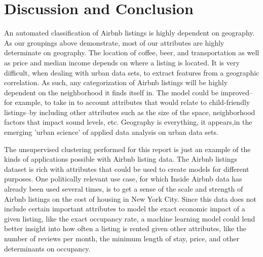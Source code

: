 \documentclass[conference]{IEEEtran}
\begin{document}
\section{Discussion and Conclusion}
An automated classification of Airbnb listings is highly dependent on geography. As our groupings above demonstrate, most of our
attributes are highly determinate on geography. The location of coffee, beer, and transportation as well as price and median income
depends on where a listing is located. It is very difficult, when dealing with urban data sets, to extract features from a geographic
correlation. As such, any categorization of Airbnb listings will be highly dependent on the neighborhood it finds itself in. The 
model could be improved–for example, to take in to account attributes that would relate to child-friendly listings–by including
other attributes such as the size of the space, neighborhood factors that impact sound levels, etc. Geography is everything, it 
appears,in the emerging 'urban science' of applied data analysis on urban data sets.

The unsupervised clustering performed for this report is just an example of the kinds of applications possible with Airbnb listing
data. The Airbnb listings dataset is rich with attributes that could be used to create models for different purposes. One 
politically relevant use case, for which Inside Airbnb data has already been used several times, is to get a sense of the scale 
and strength of Airbnb listings on the cost of housing in New York City. Since this data does not include certain important attributes
to model the exact economic impact of a given listing, like the exact occupancy rate, a machine learning model could lend better
insight into how often a listing is rented given other attributes, like the number of reviews per month, the minimum length of stay, 
price, and other determinants on occupancy.


%
%
\end{document}
